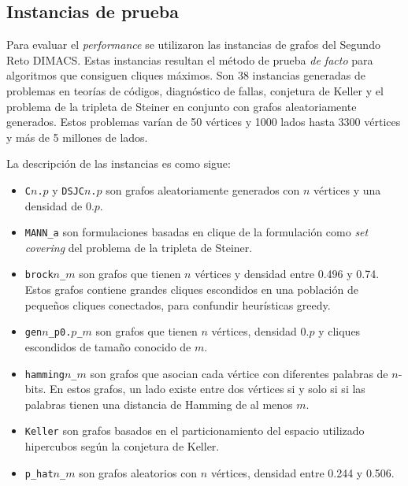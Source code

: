 \documentclass[conference]{IEEEtran}
\begin{document}
\subsection{Instancias de prueba}
\label{sec:aco}

Para evaluar el \emph{performance} se utilizaron las instancias de
grafos del Segundo Reto DIMACS. Estas instancias resultan el método de
prueba \emph{de facto} para algoritmos que consiguen cliques
máximos. Son 38 instancias generadas de problemas en teorías de
códigos, diagnóstico de fallas, conjetura de Keller y el problema de
la tripleta de Steiner en conjunto con grafos aleatoriamente
generados.  Estos problemas varían de 50 vértices y 1000 lados hasta
3300 vértices y más de 5 millones de lados.

La descripción de las instancias es como sigue:

\begin{itemize}
\item \texttt{C$n$.$p$} y \texttt{DSJC$n$.$p$} son grafos
  aleatoriamente generados con $n$ vértices y una densidad de $0.p$.

\item \texttt{MANN\_a} son formulaciones basadas en clique de la
  formulación como \emph{set covering} del problema de la tripleta de
  Steiner.
\item \texttt{brock$n$\_$m$} son grafos que tienen $n$ vértices y
  densidad entre 0.496 y 0.74.  Estos grafos contiene grandes cliques
  escondidos en una población de pequeños cliques conectados, para
  confundir heurísticas greedy.
\item \texttt{gen$n$\_p0.$p$\_$m$} son grafos que tienen $n$ vértices,
  densidad $0.p$ y cliques escondidos de tamaño conocido de $m$.

\item \texttt{hamming$n$\_$m$} son grafos que asocian cada vértice con
  diferentes palabras de $n$-bits. En estos grafos, un lado existe
  entre dos vértices si y solo si si las palabras tienen una distancia
  de Hamming de al menos $m$.
\item \texttt{Keller} son grafos basados en el particionamiento del
  espacio utilizado hipercubos según la conjetura de Keller.
\item \texttt{p\_hat$n$\_$m$} son grafos aleatorios con $n$ vértices,
  densidad entre 0.244 y 0.506.

\end{itemize}
\end{document}
